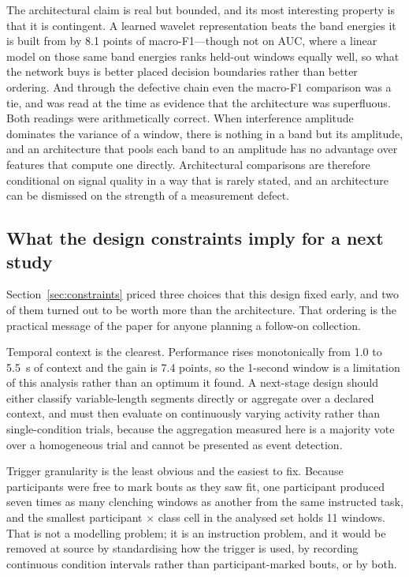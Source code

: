 \documentclass[pdflatex,sn-nature,iicol]{sn-jnl}
\begin{document}
The architectural claim is real but bounded, and its most interesting property is that it is contingent. A learned wavelet representation beats the band energies it is built from by 8.1 points of macro-F1---though not on AUC, where a linear model on those same band energies ranks held-out windows equally well, so what the network buys is better placed decision boundaries rather than better ordering. And through the defective chain even the macro-F1 comparison was a tie, and was read at the time as evidence that the architecture was superfluous. Both readings were arithmetically correct. When interference amplitude dominates the variance of a window, there is nothing in a band but its amplitude, and an architecture that pools each band to an amplitude has no advantage over features that compute one directly. Architectural comparisons are therefore conditional on signal quality in a way that is rarely stated, and an architecture can be dismissed on the strength of a measurement defect.

\subsection{What the design constraints imply for a next study}

Section~\ref{sec:constraints} priced three choices that this design fixed early, and two of them turned out to be worth more than the architecture. That ordering is the practical message of the paper for anyone planning a follow-on collection.

Temporal context is the clearest. Performance rises monotonically from 1.0 to 5.5~s of context and the gain is 7.4 points, so the 1-second window is a limitation of this analysis rather than an optimum it found. A next-stage design should either classify variable-length segments directly or aggregate over a declared context, and must then evaluate on continuously varying activity rather than single-condition trials, because the aggregation measured here is a majority vote over a homogeneous trial and cannot be presented as event detection.

Trigger granularity is the least obvious and the easiest to fix. Because participants were free to mark bouts as they saw fit, one participant produced seven times as many clenching windows as another from the same instructed task, and the smallest participant $\times$ class cell in the analysed set holds 11 windows. That is not a modelling problem; it is an instruction problem, and it would be removed at source by standardising how the trigger is used, by recording continuous condition intervals rather than participant-marked bouts, or by both.
\end{document}
